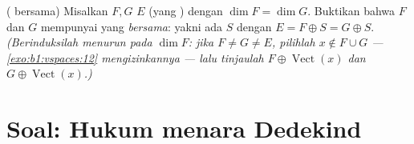 \begin{exercise}[$\star\star\star$]\label{exo:b1:findim:12}
( bersama) Misalkan $F, G$  $E$ (yang ) dengan $\dim F = \dim G$. Buktikan bahwa $F$ dan $G$ mempunyai
 yang \emph{bersama}: yakni ada  $S$ dengan $E = F
\oplus S = G \oplus S$. \emph{(Berinduksilah menurun pada $\dim F$: jika $F
\neq G \neq E$, pilihlah $x \notin F \cup G$ ---
\cref{exo:b1:vspaces:12} mengizinkannya --- lalu tinjaulah $F \oplus
\operatorname{Vect}(x)$ dan $G \oplus \operatorname{Vect}(x)$.)}
\end{exercise}

\section{Soal: Hukum menara Dedekind}

